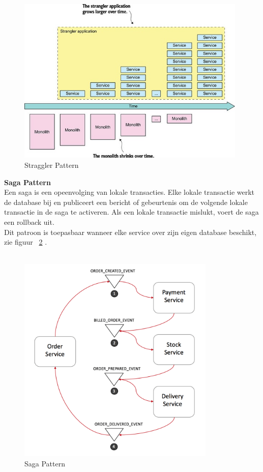 \begin{figure}[!htb]
    \centering
    \includegraphics[height=8cm]{strangler.jpg}
    \caption{Straggler Pattern \label{stangler}}
\end{figure}

\textbf{Saga Pattern}
\\Een saga is een opeenvolging van lokale transacties. Elke lokale transactie werkt de database bij en publiceert een bericht of gebeurtenis om de volgende lokale transactie in de saga te activeren. Als een lokale transactie mislukt, voert de saga een rollback uit.\\
Dit patroon is toepasbaar wanneer elke service over zijn eigen database beschikt, zie figuur ~\ref{Saga} . \\ \\

\begin{figure}[!htb]
    \centering
    \includegraphics[height=10cm]{Saga.png}
    \caption{Saga Pattern \label{Saga}}
\end{figure}


